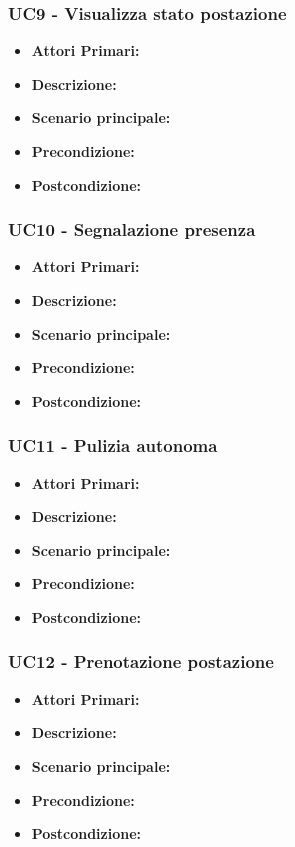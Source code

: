 \subsubsection{ UC9 - Visualizza stato postazione}
\begin{itemize}
           	\item\textbf{Attori Primari:} 
           	\item\textbf{Descrizione:} 
           	\item\textbf{Scenario principale:} 
           	\item\textbf{Precondizione:} 
           	\item\textbf{Postcondizione:}
\end{itemize}

\subsubsection{ UC10 - Segnalazione presenza}
\begin{itemize}
           	\item\textbf{Attori Primari:} 
           	\item\textbf{Descrizione:} 
           	\item\textbf{Scenario principale:} 
           	\item\textbf{Precondizione:} 
           	\item\textbf{Postcondizione:}
\end{itemize}

\subsubsection{ UC11 - Pulizia autonoma}
\begin{itemize}
           	\item\textbf{Attori Primari:} 
           	\item\textbf{Descrizione:} 
           	\item\textbf{Scenario principale:} 
           	\item\textbf{Precondizione:} 
           	\item\textbf{Postcondizione:}
\end{itemize}

\subsubsection{ UC12 - Prenotazione postazione}
\begin{itemize}
           	\item\textbf{Attori Primari:} 
           	\item\textbf{Descrizione:} 
           	\item\textbf{Scenario principale:} 
           	\item\textbf{Precondizione:} 
           	\item\textbf{Postcondizione:}
\end{itemize}

